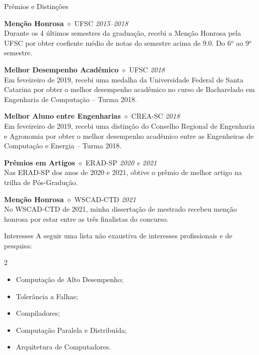 \documentclass[a4paper]{resume}
\begin{document}
\begin{rSection}{Prêmios e Distinções}

{\bf Menção Honrosa} $\diamond$ {UFSC} \hfill{\em 2015--2018} \\
Durante os 4 últimos semestres da graduação, recebi a Menção Honrosa pela UFSC por 
obter coefiente médio de notas do semestre acima de 9.0. Do 6$^o$ ao 9$^o$ semestre.

{\bf Melhor Desempenho Acadêmico} $\diamond$ {UFSC} \hfill{\em 2018} \\
Em feveireiro de 2019, recebi uma medalha da Universidade Federal de Santa Catarina por obter o
melhor desempenho acadêmico no curso de Bacharelado em Engenharia de Computação -- Turma 2018.

{\bf Melhor Aluno entre Engenharias} $\diamond$ {CREA-SC} \hfill{\em 2018} \\
Em feveireiro de 2019, recebi uma distinção do Conselho Regional de Engenharia e Agronomia
por obter o melhor desempenho acadêmico entre as Engenheiras de Computação e Energia -- Turma 2018.

{\bf Prêmios em Artigos} $\diamond$ {ERAD-SP} \hfill{\em 2020 e 2021} \\
Nas ERAD-SP dos anos de 2020 e 2021, obtive o prêmio de melhor artigo na trilha de Pós-Gradução.

{\bf Menção Honrosa} $\diamond$ {WSCAD-CTD} \hfill{\em 2021} \\
No WSCAD-CTD de 2021, minha dissertação de mestrado recebeu menção honrosa por estar entre as três finalistas
do concurso.

\end{rSection}

\begin{rSection}{Interesses}
A seguir uma lista não exaustiva de interesses profissionais e de pesquisa:

\setlength\multicolsep{5pt}
\begin{multicols}{2}
\begin{itemize}[noitemsep]
  \item Computação de Alto Desempenho;
  \item Tolerância a Falhas;
  \item Compiladores;
  \item Computação Paralela e Distribuída;
  \item Arquitetura de Computadores.
\end{itemize}
\end{multicols}

\end{rSection}
\end{document}
